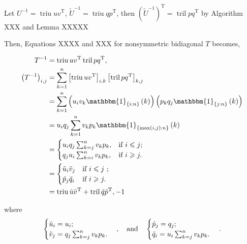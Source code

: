 \documentclass[11pt]{article}
\newcommand{\triu}{\mathop{\mathrm{triu}}}
\newcommand{\tril}{\mathop{\mathrm{tril}}}
\newcommand{\T}{\mathrm{T}}
\begin{document}
Let $U^{-1} = \triu{u v^{\T}}$, $\tilde{U}^{-1} = \triu{q p^{\T}}$, then $\left(\tilde{U}^{-1}\right)^{\T} = \tril{p q^{\T}}$ by Algorithm XXX and Lemma XXXXX

Then, Equations XXXX and XXX for nonsymmetric bidiagonal $T$ becomes,






\begin{align*}
    T^{-1} &= \triu{u v^{\T}} \tril{p q^{\T}},\\
    \left( T^{-1} \right)_{i,j} &= \sum_{k=1}^{n} 
            \left[\triu{u v^{\T}}\right]_{i,k}
            \left[\tril{p q^{\T}}\right]_{k,j}\\
        &= \sum_{k=1}^{n}
            \left(u_{i} v_{k} \mathbbm{1}_{\{i:n\}}\left( k \right)\right)
            \left(p_{k} q_{j} \mathbbm{1}_{\{j:n\}}\left( k \right)\right)\\
        &= u_{i} q_{j} \sum_{k=1}^{n}
        v_{k} p_{k} \mathbbm{1}_{\{\max\left(i,j \right):n\}}\left( k \right)\\
        &= \begin{cases}
            u_{i} q_{j} \sum_{k=j}^{n} v_{k} p_{k} ,&  \text{if } i \leqslant j ; \\ 
            q_{j} u_{i} \sum_{k=i}^{n} v_{k} p_{k} ,&  \text{if } i \geqslant j .
        \end{cases}\\
        &=  \begin{cases}
            \tilde{u}_{i} \tilde{v}_{j} &  \text{if } i \leqslant j \ ; \\ 
            \tilde{p}_{j} \tilde{q}_{i} &  \text{if } i \geqslant j .
            \end{cases} \\
        &= \triu{\tilde{u} \tilde{v}^{\T}} + \tril{\tilde{q} \tilde{p}^{\T}, -1}
\end{align*}\par
where
\begin{equation*}
    \begin{cases}
        \tilde{u}_{i} = u_{i}; \\ 
        \tilde{v}_{j} = q_{j} \sum_{k=j}^{n} v_{k} p_{k} .
    \end{cases}, \qand
    \begin{cases}
        \tilde{p}_{j} = q_{j}; \\ 
        \tilde{q}_{i} = u_{i} \sum_{k=j}^{n} v_{k} p_{k} .
    \end{cases} .
\end{equation*}\par
\end{document}
